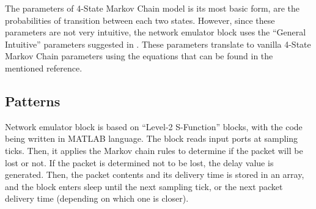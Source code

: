 \documentclass[a4paper, 11pt]{article}
\begin{document}
The parameters of 4-State Markov Chain model is its most basic form, are the probabilities of transition between each two states. However, since these parameters are not very intuitive, the network emulator block uses the ``General Intuitive'' parameters suggested in \cite{Ludovici2012}. These parameters translate to vanilla 4-State Markov Chain parameters using the equations that can be found in the mentioned reference.

\subsection{Patterns}
Network emulator block is based on ``Level-2 S-Function'' blocks, with the code being written in MATLAB language. The block reads input ports at sampling ticks. Then, it applies the Markov chain rules to determine if the packet will be lost or not. If the packet is determined not to be lost, the delay value is generated. Then, the packet contents and its delivery time is stored in an array, and the block enters sleep until the next sampling tick, or the next packet delivery time (depending on which one is closer).



\end{document}
